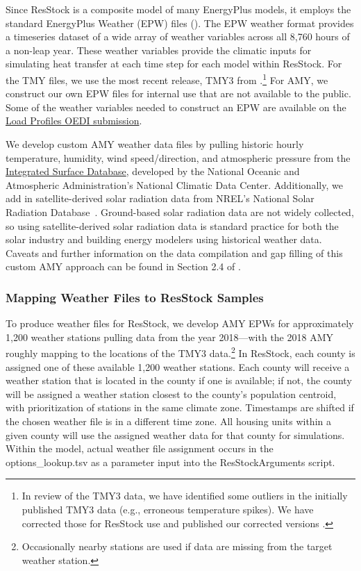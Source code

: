 Since ResStock is a composite model of many EnergyPlus models, it employs the standard EnergyPlus Weather (EPW) files (\cite{BigLadderSoftware2015}). The EPW weather format provides a timeseries dataset of a wide array of weather variables across all 8,760 hours of a non-leap year. These weather variables provide the climatic inputs for simulating heat transfer at each time step for each model within ResStock. For the TMY files, we use the most recent release, TMY3 from \citet{Wilcox2008}.\footnote{In review of the TMY3 data, we have identified some outliers in the initially published TMY3 data (e.g., erroneous temperature spikes). We have corrected those for ResStock use and published our corrected versions \citep{Bianchi2021}. }  For AMY,  we construct our own EPW files for internal use that are not available to the public. Some of the weather variables needed to construct an EPW are available on the \href{https://data.openei.org/submissions/4520}{Load Profiles OEDI submission}. 

We develop custom AMY weather data files by pulling historic hourly temperature, humidity, wind speed/direction, and atmospheric pressure from the \href{https://www.ncei.noaa.gov/products/land-based-station/integrated-surface-database}{Integrated Surface Database}, developed by the National Oceanic and Atmospheric Administration's National Climatic Data Center. Additionally, we add in satellite-derived solar radiation data from NREL’s National Solar Radiation Database~\citep{nsrdb}. Ground-based solar radiation data are not widely collected, so using satellite-derived solar radiation data is standard practice for both the solar industry and building energy modelers using historical weather data. Caveats and further information on the data compilation and gap filling of this custom AMY approach can be found in Section 2.4 of \citet{Wilson2022}. 

\subsubsection{Mapping Weather Files to ResStock Samples}
To produce weather files for ResStock, we develop AMY EPWs for approximately 1,200 weather stations pulling data from the year 2018---with the 2018 AMY roughly mapping to the locations of the TMY3 data.\footnote{Occasionally nearby stations are used if data are missing from the target weather station.} In ResStock, each county is assigned one of these available 1,200  weather stations. Each county will receive a weather station that is located in the county if one is available; if not, the county will be assigned a weather station closest to the county's population centroid, with prioritization of stations in the same climate zone. Timestamps are shifted if the chosen weather file is in a different time zone. All housing units within a given county will use the assigned weather data for that county for simulations. Within the model, actual weather file assignment occurs in the options\_lookup.tsv as a parameter input into the ResStockArguments script. 

